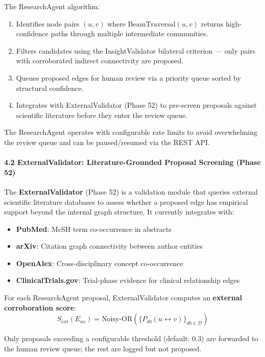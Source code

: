 The ResearchAgent algorithm:
\begin{enumerate}
\item Identifies node pairs $(u, v)$ where $\text{BeamTraversal}(u, v)$ returns high-confidence paths through multiple inter\-mediate communities.
\item Filters candidates using the InsightValidator bilateral criterion — only pairs with corro\-borated indirect conne\-ctivity are proposed.
\item Queues proposed edges for human review via a priority queue sorted by structural confidence.
\item Integrates with ExternalValidator (Phase 52) to pre-screen proposals against scientific literature before they enter the review queue.

\end{enumerate}
The ResearchAgent operates with confi\-gurable rate limits to avoid overw\-helming the review queue and can be paused/resumed via the REST API.

\paragraph{4.2 ExternalValidator: Literature-Grounded Proposal Screening (Phase 52)}
The \textbf{ExternalValidator} (Phase 52) is a validation module that queries external scientific literature databases to assess whether a proposed edge has empirical support beyond the internal graph structure. It currently integrates with:

\begin{itemize}
\item \textbf{PubMed}: MeSH term co-occurrence in abstracts
\item \textbf{arXiv}: Citation graph conne\-ctivity between author entities
\item \textbf{OpenAlex}: Cross-disci\-plinary concept co-occurrence
\item \textbf{ClinicalTrials.gov}: Trial-phase evidence for clinical relat\-ionship edges

\end{itemize}
For each ResearchAgent proposal, ExternalValidator computes an \textbf{external corro\-boration score}:
\begin{equation}
S_{ext}(E_{uv}) = \text{Noisy-OR}(\{P_{db}(u \leftrightarrow v)\}_{db \in \mathcal{D}})
\end{equation}

Only proposals exceeding a confi\-gurable threshold (default: 0.3) are forwarded to the human review queue; the rest are logged but not proposed.

